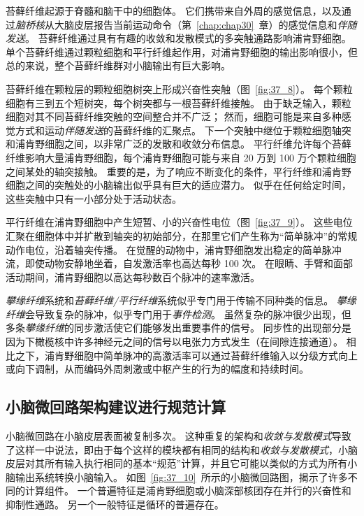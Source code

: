 苔藓纤维起源于脊髓和脑干中的细胞体。
它们携带来自外周的感觉信息，以及通过\textit{脑桥核}从大脑皮层报告当前运动命令（第~\ref{chap:chap30}~章）的感觉信息和\textit{伴随发送}。
苔藓纤维通过具有有趣的收敛和发散模式的多突触通路影响浦肯野细胞。
单个苔藓纤维通过颗粒细胞和平行纤维起作用，对浦肯野细胞的输出影响很小，但总的来说，整个苔藓纤维群对小脑输出有巨大影响。


苔藓纤维在颗粒层的颗粒细胞树突上形成兴奋性突触（图~\ref{fig:37_8}）。
每个颗粒细胞有三到五个短树突，每个树突都与一根苔藓纤维接触。
由于缺乏输入，颗粒细胞对其不同苔藓纤维突触的空间整合并不广泛；
然而，细胞可能是来自多种感觉方式和运动\textit{伴随发送}的苔藓纤维的汇聚点。
下一个突触中继位于颗粒细胞轴突和浦肯野细胞之间，以非常广泛的发散和收敛分布信息。
平行纤维允许每个苔藓纤维影响大量浦肯野细胞，每个浦肯野细胞可能与来自 20 万到 100 万个颗粒细胞之间某处的轴突接触。
重要的是，为了响应不断变化的条件，平行纤维和浦肯野细胞之间的突触处的小脑输出似乎具有巨大的适应潜力。
似乎在任何给定时间，这些突触中只有一小部分处于活动状态。


平行纤维在浦肯野细胞中产生短暂、小的兴奋性电位（图~\ref{fig:37_9}）。
这些电位汇聚在细胞体中并扩散到轴突的初始部分，在那里它们产生称为“简单脉冲”的常规动作电位，沿着轴突传播。
在觉醒的动物中，浦肯野细胞发出稳定的简单脉冲流，即使动物安静地坐着，自发激活率也高达每秒 100 次。
在眼睛、手臂和面部活动期间，浦肯野细胞以高达每秒数百个脉冲的速率激活。


\textit{攀缘纤维}系统和\textit{苔藓纤维/平行纤维}系统似乎专门用于传输不同种类的信息。
\textit{攀缘纤维}会导致复杂的脉冲，似乎专门用于\textit{事件检测}。
虽然复杂的脉冲很少出现，但多条\textit{攀缘纤维}的同步激活使它们能够发出重要事件的信号。
同步性的出现部分是因为下橄榄核中许多神经元之间的信号以电张力方式发生（在间隙连接通道）。
相比之下，浦肯野细胞中简单脉冲的高激活率可以通过苔藓纤维输入以分级方式向上或向下调制，从而编码外周刺激或中枢产生的行为的幅度和持续时间。


\subsection{小脑微回路架构建议进行规范计算}

小脑微回路在小脑皮层表面被复制多次。
这种重复的架构和\textit{收敛与发散模式}导致了这样一中说法，即由于每个这样的模块都有相同的结构和\textit{收敛与发散模式}，小脑皮层对其所有输入执行相同的基本“规范”计算，并且它可能以类似的方式为所有小脑输出系统转换小脑输入。
如图~\ref{fig:37_10}~所示的小脑微回路图，揭示了许多不同的计算组件。
一个普遍特征是浦肯野细胞或小脑深部核团存在并行的兴奋性和抑制性通路。
另一个一般特征是循环的普遍存在。



